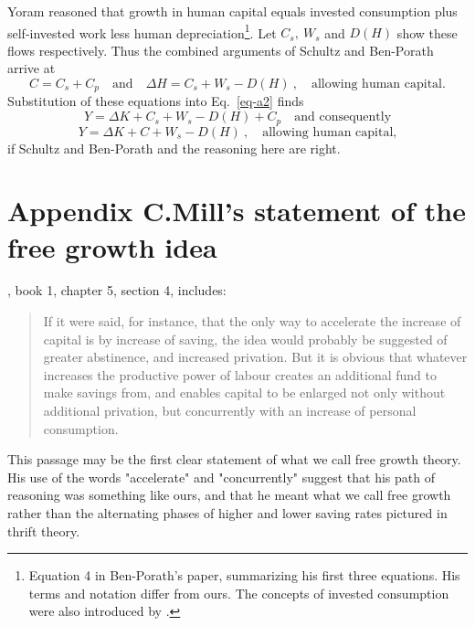 \documentclass[a4paper,fleqn]{latex_styles/cas-sc}
\begin{document}
Yoram \citet{ben-porathProductionHumanCapital1967} reasoned
that growth in human capital equals invested consumption plus
self-invested work less human depreciation\footnote{Equation 4 in
  Ben-Porath's paper, summarizing his first three equations. His terms and
  notation differ from ours. The concepts of invested consumption were
  also introduced by \citet{schultzInvestmentHumanCapital1961}.}.
Let \(C_{s},\ W_{s}\) and \(D(H)\) show these flows respectively.
Thus the combined arguments of Schultz and Ben-Porath arrive at
%
\begin{equation}
C = C_{s} + C_{p} \quad \text{and}
\quad \Delta H = C_{s} + W_{s} - D(H)\ , \quad \text{allowing human capital.}\label{eq-a3}
\end{equation}
%
Substitution of these equations into Eq.~\eqref{eq-a2} finds
%
\[Y = \Delta K + C_{s} + W_{s} - D(H) + C_{p} \quad \text{and consequently}\]
%
\vspace{-5ex}
\begin{equation}
    Y = \Delta K + C + W_{s} - D(H)\ , \quad \text{allowing human capital,}\label{eq-a4}
\end{equation}
%
if Schultz and Ben-Porath and the reasoning here are right.

\renewcommand{\theequation}{C.\arabic{equation}}
\setcounter{equation}{0}

\hypertarget{appendix-c}{%
\section*{Appendix C.\hspace{0.5em}Mill's statement of the free growth idea}\label{appendix-c}}

\cite{millPrinciplesPoliticalEconomy1848}, book 1, chapter 5, section 4, includes:
\begin{quote}
If it were said, for instance, that the only way to accelerate the increase of capital is by increase of saving, the idea would probably be suggested of greater abstinence, and increased privation. But it is obvious that whatever increases the productive power of labour creates an additional fund to make savings from, and enables capital to be enlarged not only without additional privation, but concurrently with an increase of personal consumption. 
\end{quote}

This passage may be the first clear statement of what we call free growth theory. His use of the words "accelerate" and "concurrently" suggest that his path of reasoning was something like ours, and that he meant what we call free growth rather than the alternating phases of higher and lower saving rates pictured in thrift theory.



\printcredits

% 



\end{document}
